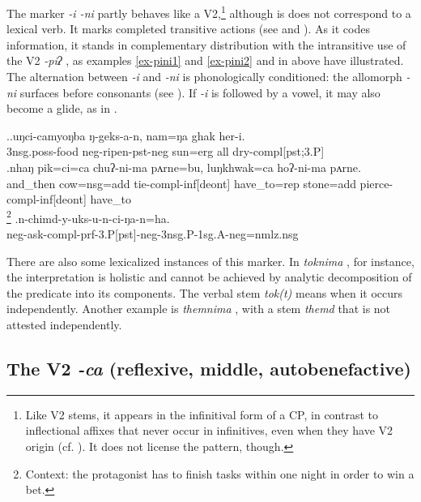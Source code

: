 The marker  \emph{-i \ti -ni}  partly behaves like a V2,\footnote{Like V2 stems, it appears in the infinitival form of a CP, in contrast to inflectional affixes that never occur in infinitives, even when they have V2 origin (cf. ). It does not license the  pattern, though.} although is does  not  correspond to a lexical verb. It  marks  completed transitive actions (see \Next and ). As it codes  information, it stands in complementary distribution with the intransitive  use of the V2 \emph{-piʔ} , as examples \ref{ex-pini1} and \ref{ex-pini2} and  in   above have illustrated. The  alternation between \emph{-i} and \emph{-ni} is phonologically conditioned: the allomorph \emph{-ni} surfaces before consonants (see ). If \emph{-i} is followed by a vowel, it may also become a glide, as in \Next[c].

\ex.\ag.uŋci-camyoŋba  ŋ-geks-a-n,   nam=ŋa   ghak her-i.\\
{\sc 3nsg.poss-}food {\sc neg-}ripen{\sc [3sg]-pst-neg} sun{\sc =erg} all dry{\sc -compl[pst;3.P]}\\
\bg.nhaŋ     pik=ci=ca  chuʔ-ni-ma     pʌrne=bu,  luŋkhwak=ca  hoʔ-ni-ma     pʌrne.\\
and\_then cow{\sc =nsg=add} tie{\sc -compl-inf[deont]} have\_to{\sc =rep}  stone{\sc =add}  pierce{\sc -compl-inf[deont]} have\_to\\
\footnote{Context: the protagonist has to finish tasks within one night in order to win a bet.} 
\bg.n-chimd-y-uks-u-n-ci-ŋa-n=ha.\\
{\sc neg-}ask{\sc -compl-prf-3.P[pst]-neg-3nsg.P-1sg.A-neg=nmlz.nsg}\\

There are also some  lexicalized instances of this marker. In \emph{toknima} , for instance, the interpretation is holistic and cannot be achieved by analytic decomposition of the predicate into its components. The verbal stem \emph{tok(t)} means  when it occurs independently. Another example is \emph{themnima} , with a stem \emph{themd} that is not attested independently.


\subsection{The V2 \emph{-ca} (reflexive, middle, autobenefactive)}\label{V2-eat}%

